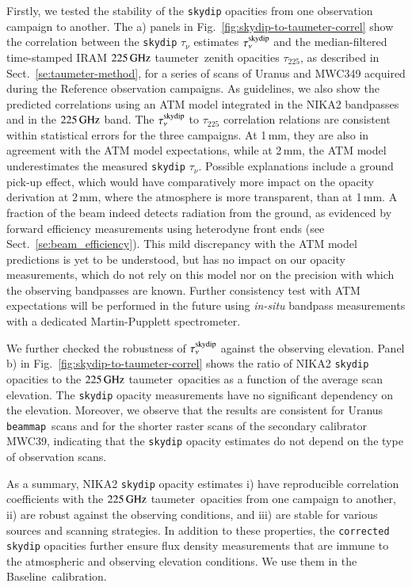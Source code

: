 \documentclass[traditionalabstract]{aa}
\newcommand{\bm}{{\tt beammap}}
\newcommand{\baseline}{Baseline}%
\newcommand{\taunu}{\tau_{\nu}}
\newcommand{\taumeter}{taumeter}
\newcommand{\lp}[1]{#1}
\newcommand{\rev}[1]{#1}
\begin{document}
{Firstly, we tested the stability of the {\tt skydip} opacities from one
observation campaign to
another. The a) panels in Fig.~\ref{fig:skydip-to-taumeter-correl} show the
correlation between the {\tt skydip} $\taunu$ estimates $\taunu^{\rm{skydip}}$
and the median-filtered time-stamped IRAM $225\,\rm{GHz}$ \taumeter\ 
zenith opacities $\tau_{225}$, as described in
Sect.~\ref{se:taumeter-method}, for a series of scans
of Uranus and MWC349 acquired during the Reference observation
campaigns. As guidelines,
we also show the predicted correlations using an ATM model integrated
in the NIKA2 bandpasses and in the $225\,\rm{GHz}$ band. {\lp The
$\taunu^{\rm{skydip}}$ to $\tau_{225}$ correlation relations are
consistent within statistical errors for the three campaigns.}
At 1\,mm, they are also in agreement with the ATM model expectations,
while at 2\,mm, the ATM model underestimates the measured {\tt skydip}
$\taunu$. {\rev Possible explanations include a ground pick-up effect,
which would have comparatively more impact on the opacity derivation
at 2\,mm, where the atmosphere is more transparent, than at
1\,mm. A fraction of the beam indeed detects radiation from the
ground, as evidenced by forward efficiency measurements using
heterodyne front ends (see Sect.~\ref{se:beam_efficiency}).}
This mild discrepancy with the ATM model predictions is yet to be
understood, but has no impact on
our opacity measurements, which do not rely on this model nor on
the precision with which the observing bandpasses are known. {\lp
Further consistency test with ATM expectations will be performed in the
future using \emph{in-situ} bandpass measurements with a
dedicated Martin-Pupplett spectrometer.}


We further checked the robustness of $\taunu^{\rm{skydip}}$ against the
observing elevation. 
Panel b) in Fig.~\ref{fig:skydip-to-taumeter-correl} shows the ratio of NIKA2
{\tt skydip} opacities to the $225\,\rm{GHz}$ \taumeter\ opacities as a function of
the average scan elevation. The {\tt skydip} opacity measurements have
no significant dependency on the elevation. Moreover, we observe that
the results are consistent for Uranus \bm\ scans and for
the shorter raster scans of the secondary calibrator MWC39, indicating
that the {\tt skydip} opacity estimates do not depend on the type of
observation scans.


As a summary, NIKA2 {\tt skydip} opacity estimates i) have reproducible
correlation coefficients with the $225\,\rm{GHz}$ \taumeter\ opacities from one
campaign to another, ii) are robust against the observing conditions,
and iii) are stable for various sources and scanning strategies. {\lp
In addition to these properties, the {\tt corrected skydip} opacities
further ensure flux density measurements that are immune to the
atmospheric and observing elevation conditions. We use them in
the \baseline\ calibration.}


}
\end{document}
